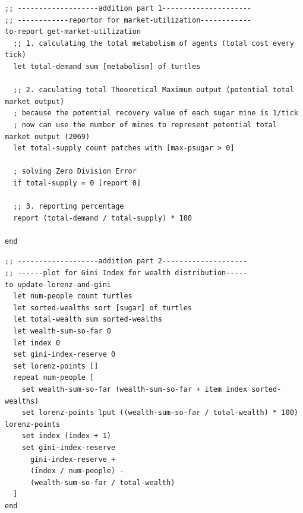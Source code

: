 \documentclass{article}
\begin{document}
\vspace{1.5em}

\begin{lstlisting}[language=NetLogo, caption={Reporter for market-utilization}]
;; -------------------addition part 1---------------------
;; ------------reportor for market-utilization------------
to-report get-market-utilization
  ;; 1. calculating the total metabolism of agents (total cost every tick)
  let total-demand sum [metabolism] of turtles
  
  ;; 2. caculating total Theoretical Maximum output (potential total market output)
  ; because the potential recovery value of each sugar mine is 1/tick
  ; now can use the number of mines to represent potential total market output (2069)
  let total-supply count patches with [max-psugar > 0]
  
  ; solving Zero Division Error
  if total-supply = 0 [report 0]

  ;; 3. reporting percentage
  report (total-demand / total-supply) * 100

end
\end{lstlisting}




\begin{lstlisting}[language=NetLogo, caption={Reporter for Gini Index}]
;; -------------------addition part 2--------------------
;; ------plot for Gini Index for wealth distribution-----
to update-lorenz-and-gini
  let num-people count turtles
  let sorted-wealths sort [sugar] of turtles
  let total-wealth sum sorted-wealths
  let wealth-sum-so-far 0
  let index 0
  set gini-index-reserve 0
  set lorenz-points []
  repeat num-people [
    set wealth-sum-so-far (wealth-sum-so-far + item index sorted-wealths)
    set lorenz-points lput ((wealth-sum-so-far / total-wealth) * 100) lorenz-points
    set index (index + 1)
    set gini-index-reserve
      gini-index-reserve +
      (index / num-people) -
      (wealth-sum-so-far / total-wealth)
  ]
end
\end{lstlisting}
\end{document}
